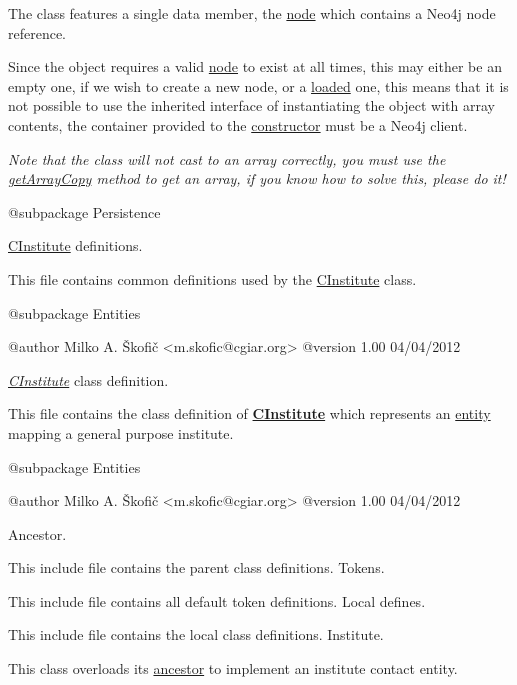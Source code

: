 The class features a single data member, the \hyperlink{}{node} which contains a Neo4j node reference.

Since the object requires a valid \hyperlink{}{node} to exist at all times, this may either be an empty one, if we wish to create a new node, or a \hyperlink{}{loaded} one, this means that it is not possible to use the inherited interface of instantiating the object with array contents, the container provided to the \hyperlink{}{constructor} must be a Neo4j client.

{\itshape Note that the class will not cast to an array correctly, you must use the \hyperlink{}{get\-Array\-Copy} method to get an array, if you know how to solve this, please do it!}

\begin{DoxyVerb} @subpackage        Persistence\end{DoxyVerb}


\hyperlink{class_c_institute}{C\-Institute} definitions.

This file contains common definitions used by the \hyperlink{class_c_institute}{C\-Institute} class.

\begin{DoxyVerb} @subpackage        Entities

 @author            Milko A. Škofič <m.skofic@cgiar.org>
 @version   1.00 04/04/2012\end{DoxyVerb}


{\itshape \hyperlink{class_c_institute}{C\-Institute}} class definition.

This file contains the class definition of {\bfseries \hyperlink{class_c_institute}{C\-Institute}} which represents an \hyperlink{class_c_entity}{entity} mapping a general purpose institute.

\begin{DoxyVerb} @subpackage        Entities

 @author            Milko A. Škofič <m.skofic@cgiar.org>
 @version   1.00 04/04/2012\end{DoxyVerb}


Ancestor.

This include file contains the parent class definitions. Tokens.

This include file contains all default token definitions. Local defines.

This include file contains the local class definitions. Institute.

This class overloads its \hyperlink{class_c_contact}{ancestor} to implement an institute contact entity.


